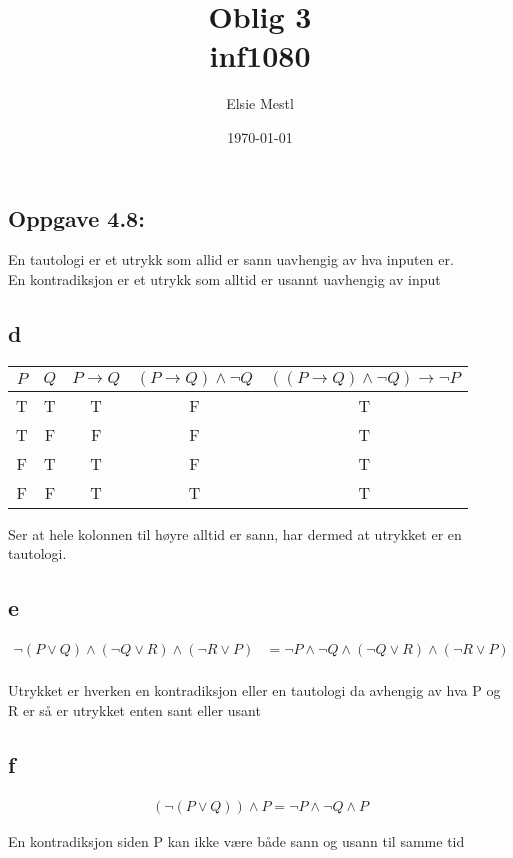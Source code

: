 \documentclass[a4paper, norsk, 10pt]{article}
\date{\today}
\title{Oblig 3 \\ inf1080}
\author{Elsie Mestl}
\begin{document}
\maketitle
\begin{flushleft}
\section*{Oppgave 4.8:}
En tautologi er et utrykk som allid er sann uavhengig av hva inputen er. \\
En kontradiksjon er et utrykk som alltid er usannt uavhengig av input

\subsection*{d}
\begin{table}[h!]
\begin{tabular}{c c || c c c }
$P$ & $Q$ & $P \rightarrow Q$ & $(P \rightarrow Q) \land \neg Q$ & $((P \rightarrow Q) \land \neg Q) \rightarrow \neg P$ \\
\hline
T & T & T & F & T \\
T & F & F & F & T \\
F & T & T & F & T \\
F & F & T & T & T 
\end{tabular}
\end{table}
Ser at hele kolonnen til høyre alltid er sann, har dermed at utrykket er en tautologi.

\subsection*{e}
\begin{align*}
\neg (P  \lor Q) \land (\neg Q \lor R ) \land (\neg R \lor P) &= \neg P \land \neg Q \land (\neg Q \lor R) \land ( \neg R \lor  P) \\
\end{align*}

Utrykket er hverken en kontradiksjon eller en tautologi da avhengig av hva P og R er så er utrykket enten sant eller usant 

\subsection*{f}
\begin{align*}
(\neg (P \lor Q)) \land P = \neg P \land \neg Q \land P 
\end{align*}

En kontradiksjon siden P kan ikke være både sann og usann til samme tid


\end{flushleft}
\end{document}

